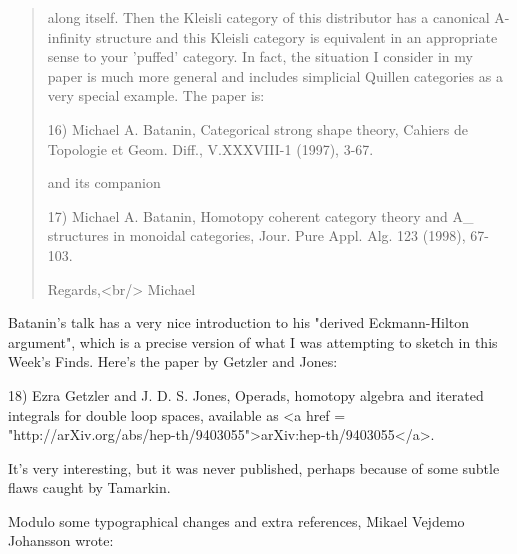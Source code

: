 \begin{quote}
   along itself.  Then the Kleisli category of this distributor has a 
   canonical A-infinity structure and this Kleisli category is equivalent 
   in an appropriate sense to your 'puffed' category.  In fact, the 
   situation I consider in my paper is much more general and includes 
   simplicial Quillen categories as a very special example.  The paper is:

   16) Michael A. Batanin, Categorical strong shape theory, Cahiers de 
   Topologie et Geom. Diff., V.XXXVIII-1 (1997), 3-67. 

   and its companion 

   17) Michael A. Batanin, Homotopy coherent category theory and 
   A_{\infty } structures in monoidal categories, Jour. Pure Appl. 
   Alg. 123 (1998), 67-103.

  Regards,<br/>
  Michael 
\end{quote}

Batanin's talk has a very nice introduction to his "derived 
Eckmann-Hilton argument", which is a precise version of what I was 
attempting to sketch in this Week's Finds.  Here's the paper by
Getzler and Jones:

18) Ezra Getzler and J. D. S. Jones, Operads, homotopy algebra and 
iterated integrals for double loop spaces, available as 
<a href = "http://arXiv.org/abs/hep-th/9403055">arXiv:hep-th/9403055</a>.

It's very interesting, but it was never published, perhaps because 
of some subtle flaws caught by Tamarkin. 

Modulo some typographical changes and extra references, Mikael Vejdemo
Johansson wrote:

